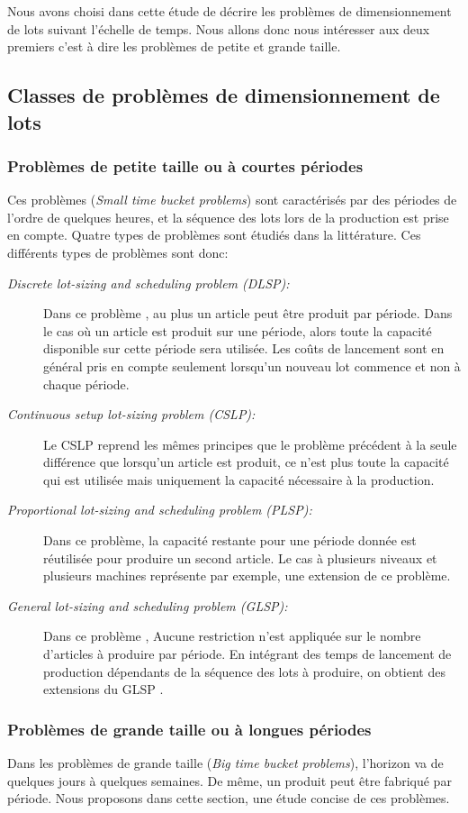 	Nous avons choisi dans cette étude de décrire les problèmes de dimensionnement de lots suivant l'échelle de temps. Nous allons donc nous intéresser aux deux premiers c'est à dire les problèmes de petite et grande taille.
\subsection{Classes de problèmes de dimensionnement de lots}
	\subsubsection{Problèmes de petite taille ou à courtes périodes}
	Ces problèmes (\emph{Small time bucket problems}) sont caractérisés par des périodes de l'ordre de quelques heures, et la séquence des lots lors de la production est prise en compte. Quatre types de problèmes sont étudiés dans la littérature. Ces différents types de problèmes sont donc:
	\begin{description}
		\item[\textsl{Discrete lot-sizing and scheduling problem (DLSP):}] Dans ce problème \cite{fleischmann}, au plus un article peut être produit par période. Dans le cas où un article est produit sur une période, alors toute la capacité disponible sur cette période sera utilisée. Les coûts de lancement sont en général pris en compte seulement lorsqu'un nouveau lot commence et non à chaque période.
		\item[\textsl{Continuous setup lot-sizing problem (CSLP):}]
		Le CSLP reprend les mêmes principes que le problème précédent à la seule différence que lorsqu'un article est produit, ce n'est plus toute la capacité qui est utilisée mais uniquement la capacité nécessaire à la production.
		\item[\textsl{Proportional lot-sizing and scheduling problem (PLSP):}] 
		Dans ce problème, la capacité restante pour une période donnée est réutilisée pour produire un second article. Le cas à plusieurs niveaux et plusieurs machines représente par exemple, une extension de ce problème. 
		\item[\textsl{General lot-sizing and scheduling problem (GLSP):}] 
		Dans ce problème \cite{fleischmann_meyr}, Aucune restriction n'est appliquée sur le nombre d'articles à produire par période. En intégrant des temps de lancement de production dépendants de la séquence des lots à produire, on obtient des extensions du GLSP \cite{meyr}.
	\end{description}
	
	\subsubsection{Problèmes de grande taille ou à longues périodes}
	Dans les problèmes de grande taille (\emph{Big time bucket problems}), l'horizon va de quelques jours à quelques semaines. De même, un produit peut être fabriqué par période. Nous proposons dans cette section, une étude concise de ces problèmes.
	
